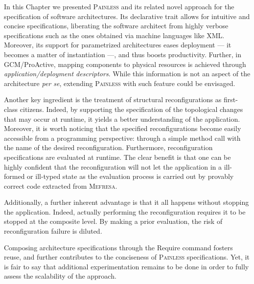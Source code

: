 In this Chapter we presented \textsc{Painless} and its related novel approach for the
 specification of software architectures. Its declarative trait allows for intuitive
 and concise specifications, liberating the software architect from 
 highly verbose specifications such as the ones obtained via 
 machine languages like XML. Moreover, its support for parametrized 
 architectures eases deployment --- it becomes a 
 matter of instantiation ---, and thus boosts productivity. Further,
 in GCM/ProActive, mapping components to physical resources 
 is achieved through \textit{application/deployment descriptors}. 
 While this information is not an aspect
 of the architecture \textit{per se}, extending \textsc{Painless}
 with such feature could be envisaged.
 
 
 	Another key ingredient is the treatment
 of structural reconfigurations as first-class citizens. Indeed, by supporting
 the specification of the topological changes that may occur at runtime,
 it yields a better understanding of the application. Moreover, it is worth noticing
 that the specified reconfigurations become easily accessible from a programming 
 perspective: through a simple method call with the name of the desired reconfiguration.
 Furthermore, reconfiguration specifications are evaluated	 at runtime.
 The clear benefit is that one can be highly confident that the reconfiguration will
 not let the application in a ill-formed or ill-typed state as
 the evaluation process is carried out by provably correct code extracted from
 \textsc{Mefresa}.
 
 Additionally,  a further inherent advantage is that it all happens without 
 stopping the application. Indeed, actually performing the
 reconfiguration requires it to be stopped at the composite level.
 By making a prior evaluation, the risk of reconfiguration 
 failure is diluted. 
 

  
  
	Composing architecture specifications through the \textsf{Require}
	command fosters reuse, and further contributes to the conciseness
	of \textsc{Painless} specifications. Yet, it is fair to say that
	additional experimentation remains to be done in order to fully
	assess the scalability of the approach. 
	  
